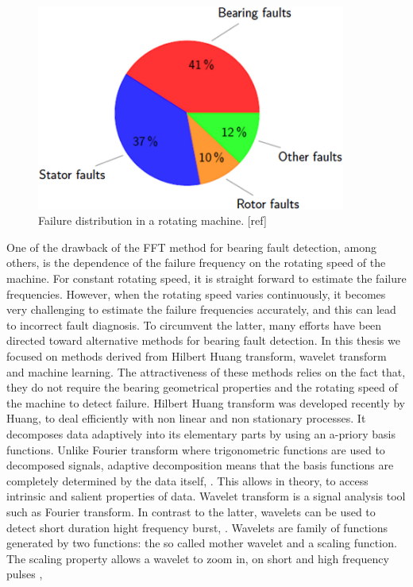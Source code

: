 \documentclass[../Main/thesis.tex]{subfiles}
\begin{document}
\begin{figure}[H] %
   \centering
   \includegraphics[width=4in]{../fig/pie.png} 
   \caption{Failure distribution in a rotating machine. [ref]}
   \label{fig:pie}
\end{figure}
\justify
One of the drawback of the FFT method for bearing fault detection, among others, is the dependence of the failure frequency on the rotating speed of the machine. For constant rotating speed, it is straight forward to estimate the failure frequencies. However, when the rotating speed varies continuously, it becomes very challenging to estimate the failure frequencies accurately, and this can lead to incorrect fault diagnosis.
\justify
To circumvent the latter, many efforts have been directed toward alternative methods for bearing fault detection. In this thesis we focused on methods derived from Hilbert Huang transform, wavelet transform and machine learning. The attractiveness of these methods relies on the fact that, they do not require the bearing geometrical properties and the rotating speed of the machine to detect failure. 
\justify
Hilbert Huang transform was developed recently by  Huang, \cite{huang98} to deal efficiently with non linear and non stationary processes. It decomposes data adaptively 
into its elementary parts by using an a-priory basis functions. Unlike Fourier transform where trigonometric functions are used to decomposed signals, adaptive decomposition means that 
the basis functions are completely determined by the data itself, \cite{huang08}. This allows in theory, to access intrinsic and salient properties of data.
\justify
Wavelet transform is a signal analysis tool such as Fourier transform. In contrast to the latter, wavelets can be used to detect short duration hight frequency burst, \cite{albert09}.
Wavelets are family of functions generated by two functions: the so called mother wavelet and a scaling function. The scaling property allows a wavelet to zoom in, on short and high frequency pulses \cite{albert09},
\end{document}

